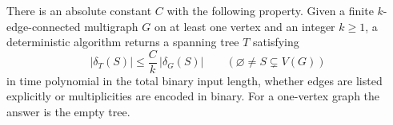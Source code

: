 \begin{theorem}
\label{thm:tt-algorithm}
There is an absolute constant $C$ with the following property. Given a
finite $k$-edge-connected multigraph $G$ on at least one vertex and
an integer $k\ge1$,
a deterministic algorithm returns a spanning tree $T$ satisfying
\begin{equation}
 |\delta_T(S)|\le \frac Ck\,|\delta_G(S)|
       \qquad(\varnothing\ne S\subsetneq V(G))
 \label{eq:ta-thin}
\end{equation}
in time polynomial in the total binary input length, whether edges
are listed explicitly or multiplicities are encoded in binary.
For a one-vertex graph the answer is the empty tree.
\end{theorem}
